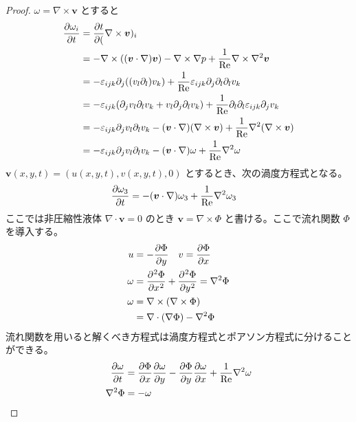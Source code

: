 \documentclass[uplatex,diffipdfmx,a4paper,11pt]{jlreq}
\begin{document}
\begin{proof}
  $\omega = \nabla\times\bm{v}$ とすると
  \begin{align}
    \diffp{\omega_i}{t} & = \diffp{t}(\nabla\times\bm{v})_i                                                                                                                       \\
                        & = -\nabla\times((\bm{v}\cdot\nabla)\bm{v}) - \nabla\times\nabla p + \frac{1}{\mathrm{Re}}\nabla\times\nabla^2\bm{v}                                     \\
                        & = -\varepsilon_{ijk}\partial_j((v_l\partial_l)v_k) + \frac{1}{\mathrm{Re}}\varepsilon_{ijk}\partial_j\partial_l\partial_lv_k                            \\
                        & = -\varepsilon_{ijk}(\partial_jv_l\partial_lv_k + v_l\partial_j\partial_lv_k) + \frac{1}{\mathrm{Re}}\partial_l\partial_l\varepsilon_{ijk}\partial_jv_k \\
                        & = -\varepsilon_{ijk}\partial_jv_l\partial_lv_k - (\bm{v}\cdot\nabla)(\nabla\times\bm{v}) + \frac{1}{\mathrm{Re}}\nabla^2(\nabla\times\bm{v})            \\
                        & = -\varepsilon_{ijk}\partial_jv_l\partial_lv_k - (\bm{v}\cdot\nabla)\omega + \frac{1}{\mathrm{Re}}\nabla^2\omega
  \end{align}
  $\bm{v}(x, y, t) = (u(x, y, t), v(x, y, t), 0)$ とするとき、次の渦度方程式となる。
  \begin{align}
    \diffp{\omega_3}{t} & = - (\bm{v}\cdot\nabla)\omega_3 + \frac{1}{\mathrm{Re}}\nabla^2\omega_3
  \end{align}
  ここでは非圧縮性液体 $\nabla\cdot\bm{v} = 0$ のとき $\bm{v} = \nabla\times\Phi$ と書ける。ここで流れ関数 $\Phi$ を導入する。
  \begin{align}
    u      & = - \diffp{\Phi}{y} \quad v = \diffp{\Phi}{x}            \\
    \omega & = \diffp[2]{\Phi}{x} + \diffp[2]{\Phi}{y} = \nabla^2\Phi \\
    \omega & = \nabla\times(\nabla\times\Phi)                         \\
           & = \nabla\cdot(\nabla\Phi) - \nabla^2\Phi
  \end{align}
  流れ関数を用いると解くべき方程式は渦度方程式とポアソン方程式に分けることができる。
  \begin{align}
    \diffp{\omega}{t} & = \diffp{\Phi}{x}\diffp{\omega}{y} - \diffp{\Phi}{y}\diffp{\omega}{x} + \frac{1}{\mathrm{Re}}\nabla^2\omega \\
    \nabla^2\Phi      & = - \omega
  \end{align}
\end{proof}
\end{document}
